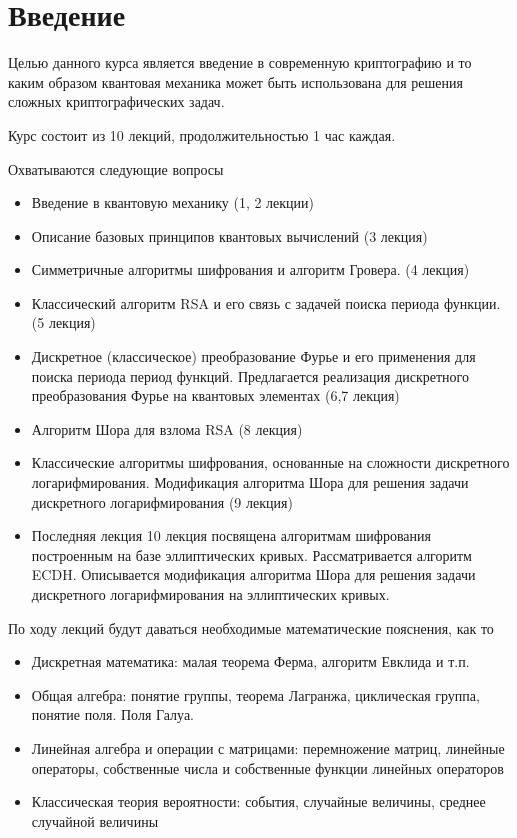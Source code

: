 \chapter*{Введение}
Целью данного курса является введение в современную криптографию и то
каким образом квантовая механика может быть использована для решения
сложных криптографических задач.

Курс состоит из 10 лекций, продолжительностью 1 час каждая.

Охватываются следующие вопросы
\begin{itemize}
\item Введение в квантовую механику (1, 2 лекции)
\item Описание базовых принципов квантовых вычислений (3 лекция)
\item Симметричные алгоритмы шифрования и алгоритм
Гровера. (4 лекция)
\item Классический алгоритм RSA и его связь с задачей поиска периода
  функции. (5 лекция) 
\item Дискретное (классическое) преобразование Фурье и
его применения для поиска периода период функций. Предлагается
реализация дискретного преобразования Фурье на квантовых элементах 
(6,7 лекция)
\item Алгоритм Шора для взлома RSA (8 лекция)
\item Классические алгоритмы шифрования, основанные на
сложности дискретного логарифмирования. Модификация алгоритма Шора для
решения задачи дискретного логарифмирования (9 лекция) 
\item Последняя лекция 10 лекция посвящена алгоритмам шифрования
  построенным на базе эллиптических кривых. Рассматривается алгоритм
  ECDH. Описывается модификация алгоритма Шора для решения задачи
  дискретного логарифмирования на эллиптических кривых.
\end{itemize}

По ходу лекций будут даваться необходимые математические пояснения, как
то
\begin{itemize}
\item Дискретная математика: малая теорема Ферма, алгоритм
  Евклида и т.п.
\item Общая алгебра: понятие группы, теорема Лагранжа, циклическая
  группа, понятие поля. Поля Галуа.
\item Линейная алгебра и операции с матрицами: перемножение матриц,
  линейные операторы, собственные числа и собственные функции линейных
  операторов
\item Классическая теория вероятности: события, случайные величины,
среднее случайной величины
\end{itemize}


